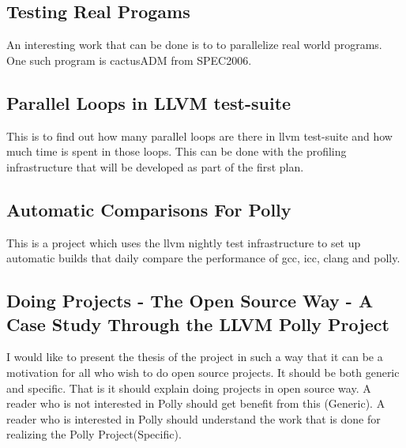 \documentclass[a4paper,10pt]{article}
\begin{document}
\subsection {Testing Real Progams}
An interesting work that can be done is to to parallelize real world programs. 
One such program is cactusADM from SPEC2006.
\subsection{Parallel Loops in LLVM test-suite}
This is to find out how many parallel loops are there in llvm test-suite and how
much time is spent in those loops. This can be done with the profiling infrastructure
that will be developed as part of the first plan.
\subsection{Automatic Comparisons For Polly}
This is a project which uses the llvm nightly test infrastructure to set up automatic 
builds that daily compare the performance of gcc, icc, clang and polly.
\subsection{Doing Projects - The Open Source Way - A Case Study Through the LLVM Polly Project}
I would like to present the thesis of the project in such a way that it can be a
motivation for all who wish to do open source projects. It should be both generic
and specific. That is it should explain doing projects in open source way.
A reader who is not  interested in Polly should get benefit from this (Generic).
A reader who is interested in Polly should understand the work that is done for 
realizing the Polly Project(Specific).

{\footnotesize


}
\end{document}
